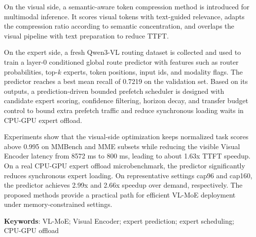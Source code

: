On the visual side, a semantic-aware token compression method is introduced for multimodal inference. It scores visual tokens with text-guided relevance, adapts the compression ratio according to semantic concentration, and overlaps the visual pipeline with text preparation to reduce TTFT.

On the expert side, a fresh Qwen3-VL routing dataset is collected and used to train a layer-0 conditioned global route predictor with features such as router probabilities, top-$k$ experts, token positions, input ids, and modality flags. The predictor reaches a best mean recall of 0.7219 on the validation set. Based on its outputs, a prediction-driven bounded prefetch scheduler is designed with candidate expert scoring, confidence filtering, horizon decay, and transfer budget control to bound extra prefetch traffic and reduce synchronous loading waits in CPU-GPU expert offload.

Experiments show that the visual-side optimization keeps normalized task scores above 0.995 on MMBench and MME subsets while reducing the visible Visual Encoder latency from 8572 ms to 800 ms, leading to about 1.63x TTFT speedup. On a real CPU-GPU expert offload microbenchmark, the predictor significantly reduces synchronous expert loading. On representative settings cap96 and cap160, the predictor achieves 2.99x and 2.66x speedup over demand, respectively. The proposed methods provide a practical path for efficient VL-MoE deployment under memory-constrained settings.

\vspace{8mm}

\textbf{Keywords}: VL-MoE; Visual Encoder; expert prediction; expert scheduling; CPU-GPU offload
